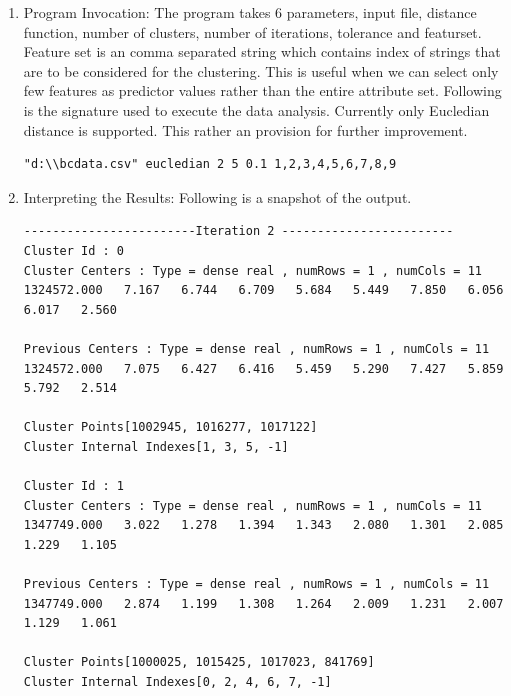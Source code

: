 \documentclass{article}
\begin{document}
\begin{enumerate}
\begin{enumerate}
\begin{enumerate}
\begin{verbatim}
\end{verbatim}
\item Program Invocation: The program takes 6 parameters, input file, distance function, number of clusters, number of iterations, tolerance and featurset. Feature set is an comma separated string which contains index of strings that are to be considered for the clustering. This is useful when we can select only few features as predictor values rather than the entire attribute set. Following is the signature used to execute the data analysis. Currently only Eucledian distance is supported. This rather an provision for further improvement.
\begin{verbatim}
"d:\\bcdata.csv" eucledian 2 5 0.1 1,2,3,4,5,6,7,8,9
\end{verbatim}
\item Interpreting the Results: Following is a snapshot of the output.
\begin{verbatim}
------------------------Iteration 2 ------------------------
Cluster Id : 0
Cluster Centers : Type = dense real , numRows = 1 , numCols = 11
1324572.000   7.167   6.744   6.709   5.684   5.449   7.850   6.056   6.017   2.560

Previous Centers : Type = dense real , numRows = 1 , numCols = 11
1324572.000   7.075   6.427   6.416   5.459   5.290   7.427   5.859   5.792   2.514

Cluster Points[1002945, 1016277, 1017122]
Cluster Internal Indexes[1, 3, 5, -1]

Cluster Id : 1
Cluster Centers : Type = dense real , numRows = 1 , numCols = 11
1347749.000   3.022   1.278   1.394   1.343   2.080   1.301   2.085   1.229   1.105  

Previous Centers : Type = dense real , numRows = 1 , numCols = 11
1347749.000   2.874   1.199   1.308   1.264   2.009   1.231   2.007   1.129   1.061  

Cluster Points[1000025, 1015425, 1017023, 841769]
Cluster Internal Indexes[0, 2, 4, 6, 7, -1]


\end{verbatim}
\end{enumerate}
\end{enumerate}
\end{enumerate}
\end{document}
